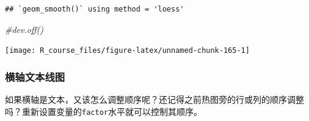 \documentclass[]{article}
\newenvironment{Shaded}{\begin{snugshade}}{\end{snugshade}}
\newcommand{\CommentTok}[1]{\textcolor[rgb]{0.56,0.35,0.01}{\textit{{#1}}}}
\numberwithin{figure}{section}
\numberwithin{table}{section}
\theoremstyle{definition}
\theoremstyle{definition}
\theoremstyle{definition}
\theoremstyle{remark}
\begin{document}
\begin{verbatim}
## `geom_smooth()` using method = 'loess'
\end{verbatim}

\begin{Shaded}
\begin{Highlighting}[]
\CommentTok{#dev.off()}
\end{Highlighting}
\end{Shaded}

\begin{center}\texttt{[image: R\_course\_files/figure-latex/unnamed-chunk-165-1]} \end{center}

\subsubsection{横轴文本线图}

如果横轴是文本，又该怎么调整顺序呢？还记得之前热图旁的行或列的顺序调整吗？重新设置变量的\texttt{factor}水平就可以控制其顺序。
\end{document}
